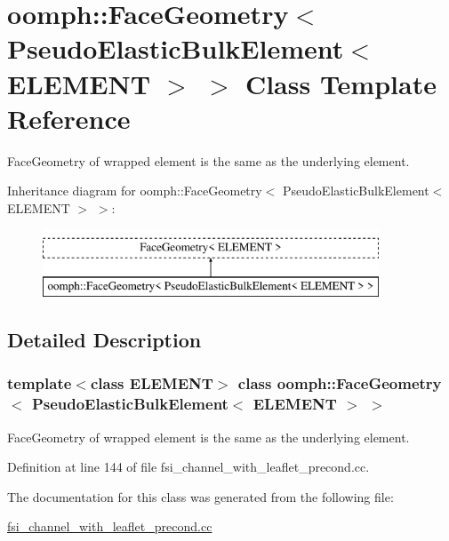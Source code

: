 \hypertarget{classoomph_1_1FaceGeometry_3_01PseudoElasticBulkElement_3_01ELEMENT_01_4_01_4}{}\section{oomph\+:\+:Face\+Geometry$<$ Pseudo\+Elastic\+Bulk\+Element$<$ E\+L\+E\+M\+E\+NT $>$ $>$ Class Template Reference}
\label{classoomph_1_1FaceGeometry_3_01PseudoElasticBulkElement_3_01ELEMENT_01_4_01_4}


Face\+Geometry of wrapped element is the same as the underlying element.  


Inheritance diagram for oomph\+:\+:Face\+Geometry$<$ Pseudo\+Elastic\+Bulk\+Element$<$ E\+L\+E\+M\+E\+NT $>$ $>$\+:\begin{figure}[H]
\begin{center}
\leavevmode
\includegraphics[height=2.000000cm]{classoomph_1_1FaceGeometry_3_01PseudoElasticBulkElement_3_01ELEMENT_01_4_01_4}
\end{center}
\end{figure}


\subsection{Detailed Description}
\subsubsection*{template$<$class E\+L\+E\+M\+E\+NT$>$\newline
class oomph\+::\+Face\+Geometry$<$ Pseudo\+Elastic\+Bulk\+Element$<$ E\+L\+E\+M\+E\+N\+T $>$ $>$}

Face\+Geometry of wrapped element is the same as the underlying element. 

Definition at line 144 of file fsi\+\_\+channel\+\_\+with\+\_\+leaflet\+\_\+precond.\+cc.



The documentation for this class was generated from the following file\+:\begin{DoxyCompactItemize}
\item 
\hyperlink{fsi__channel__with__leaflet__precond_8cc}{fsi\+\_\+channel\+\_\+with\+\_\+leaflet\+\_\+precond.\+cc}\end{DoxyCompactItemize}
